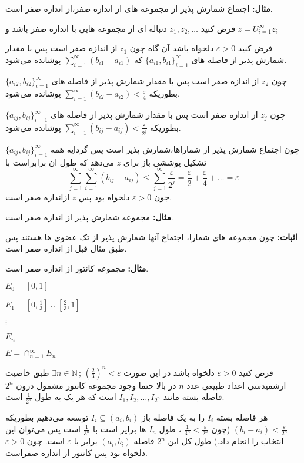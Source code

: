 \documentclass[12pt]{report}
\begin{document}
\textbf{مثال:}
اجتماع شمارش پذیر از مجموعه های از اندازه صفر،از اندازه صفر است.

فرض کنید
$z_1, z_2, \dots$
دنباله ای از مجموعه هایی با اندازه صفر باشد و 
$z = U_{i = 1}^{\infty} z_i$

فرض کنید
$\varepsilon > 0$
دلخواه باشد آن گاه چون
$z_1$
از اندازه صفر است پس با مقدار شمارش پذیر از فاصله های
$\{a_{i1}, b_{i1}\}_{i =1}^{\infty}$
که 
$\sum_{i = 1}^{\infty}(b_{i1} - a_{i1})$
پوشانده می‌شود.

چون 
$z_2$
از اندازه صفر است پس با مقدار شمارش پذیر از فاصله های
$\{a_{i2}, b_{i2}\}_{i =1}^{\infty}$
بطوریکه
$\sum_{i = 1}^{\infty}(b_{i2} - a_{i2}) < \frac{\varepsilon}{4}$
پوشانده می‌شود.

چون
$z_j$
از اندازه صفر است پس با مقدار شمارش پذیر از فاصله های
$\{a_{ij}, b_{ij}\}_{i =1}^{\infty}$
بطوریکه
$\sum_{i = 1}^{\infty}(b_{ij} - a_{ij})<\frac{\varepsilon}{2^j}$
پوشانده می‌شود.

چون اجتماع شمارش پذیر از شماراها،شمارش پذیر است پس گردایه همه
$\{a_{ij}, b_{ij}\}_{i = 1}^{\infty}$
تشکیل پوششی باز برای
$z$
می‌دهد که طول ان برابراست با
\[
\sum_{j = 1}^{\infty}\sum_{i = 1}^{\infty} (b_{ij} - a_{ij}) \leq \sum_{j = 1}^{\infty} \frac{\varepsilon}{2^j} = \frac{\varepsilon}{2} + \frac{\varepsilon}{4}+\dots  = \varepsilon
\] 
جون 
$\varepsilon > 0$
دلخواه بود پس 
$z$
ازاندازه صفر است.

\textbf{مثال:}
مجموعه شمارش پذیر از اندازه صفر است.

\textbf{اثبات:}
چون مجموعه های شمارا، اجتماع آنها شمارش پذیر از تک عضوی ها هستند پس طبق مثال قبل از اندازه صفر است.

\textbf{مثال:}
مجموعه کانتور از اندازه صفر است.


$E_0 = [0, 1]$	

$E_1 = [0,\frac{1}{3}] \cup [\frac{2}{3}, 1]$

$\vdots$

$E_n$

$E = \cap_{n = 1}^{\infty} E_n$

فرض کنید 
$\varepsilon > 0$
دلخواه باشد در این صورت 
$\exists n \in \mathbb{N}\, ;\, (\frac{2}{3})^n < \varepsilon$
طبق خاصیت ارشمیدسی اعداد طبیعی عدد 
$n$
 در بالا حتما وجود مجموعه کانتور مشمول درون
 $2^n$
 فاصله بسته  مانند
 $I_1, I_2, \dots, I_{2^n}$
 است که هر یک به طول 
 $\frac{1}{2^n}$
 است.
 
هر فاصله بسته 
$I_i$
را به یک فاصله باز
$I_i \subseteq (a_i, b_i)$
توسعه می‌دهیم بطوریکه
$(b_i - a_i) < \frac{\varepsilon}{2^n}$
(چون 
$\frac{1}{3^n} < \frac{\varepsilon}{2^n}$
، طول 
$I_n$
ها برایر است با 
$\frac{1}{3^n}$
است پس می‌توان این انتخاب را انجام داد.) طول کل این
$2^n$
فاصله 
$(a_i, b_i)$
برابر با 
$\varepsilon$
است. چون 
$\varepsilon > 0$
دلخواه بود پس کانتور از اندازه صفراست.
\end{document}
